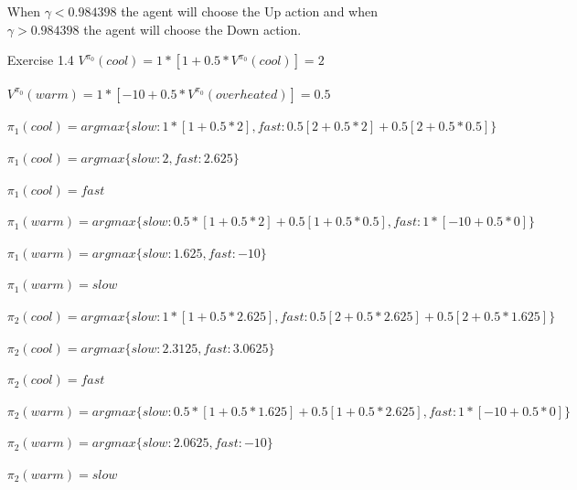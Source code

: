 \documentclass[letterpaper, 12pt]{article}
\begin{document}
\begin{enumerate}
         When $\gamma < 0.984398$ the agent will choose the Up action 
         and when $\gamma > 0.984398$ the agent will choose the Down action.
    
    \item[Exercise 1.4] 
      $V^{\pi_0}(cool) = 1*[1+0.5*V^{\pi_0}(cool)] = 2$ \\\\
      $V^{\pi_0}(warm) = 1*[-10+0.5*V^{\pi_0}(overheated)] = 0.5$ \\\\

      $\pi_1(cool) = argmax\{slow: 1*[1+0.5*2], fast: 0.5[2+0.5*2] + 0.5[2+0.5*0.5]\}$ \\\\
      $\pi_1(cool) = argmax\{slow: 2, fast: 2.625\}$ \\\\
      $\pi_1(cool) = fast$ \\\\

      $\pi_1(warm) = argmax\{slow: 0.5*[1+0.5*2]+0.5[1+0.5*0.5], fast: 1*[-10+0.5*0]\}$ \\\\
      $\pi_1(warm) = argmax\{slow: 1.625, fast: -10\}$ \\\\
      $\pi_1(warm) = slow$ \\\\

      $\pi_2(cool) = argmax\{slow: 1*[1+0.5*2.625], fast: 0.5[2+0.5*2.625] + 0.5[2+0.5*1.625]\}$ \\\\
      $\pi_2(cool) = argmax\{slow: 2.3125, fast: 3.0625\}$ \\\\
      $\pi_2(cool) = fast$ \\\\

      $\pi_2(warm) = argmax\{slow: 0.5*[1+0.5*1.625]+0.5[1+0.5*2.625], fast: 1*[-10+0.5*0]\}$ \\\\
      $\pi_2(warm) = argmax\{slow: 2.0625, fast: -10\}$ \\\\
      $\pi_2(warm) = slow$ \\\\


\end{enumerate}
\end{document}
